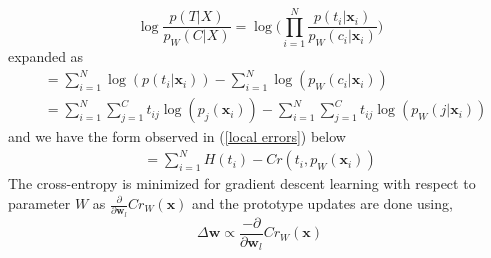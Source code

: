 \documentclass[english]{HSMW-Thesis}
\begin{document}
\begin{equation*}
	\log \frac{p\left( T|X\right) }{p_{W}\left( C|X\right) } = \log \bigg(\prod_{i=1}^{N}\frac{p\left( t_{i}|\mathbf{x}_{i}\right) }{p_{W}\left( c_{i}|\mathbf{x}_{i}\right)}\bigg)
\end{equation*}
expanded as
\begin{align*}
	&= \sum_{i=1}^{N}\log\left( p\left( t_{i}|\mathbf{x}_{i}\right)\right) - \sum_{i=1}^{N}\log\left( p_{W}\left( c_{i}|\mathbf{x}_{i}\right)\right) \\
	&=\sum_{i=1}^{N}\sum_{j=1}^{C}t_{ij}\log\left( p_{j}\left( \mathbf{x}_{i}\right) \right)- \sum_{i=1}^{N}\sum_{j=1}^{C}t_{ij}\log\left( p_{W}\left(j| \mathbf{x}_{i}\right) \right)
\end{align*}
and we have the form observed in (\ref{local errors}) below
 \begin{align*}
 	=\sum_{i=1}^{N}H\left( t_{i}\right)  - Cr\left( t_{i},p_{W}\left( \mathbf{x}_{i}\right) \right) 
 \end{align*}
The cross-entropy is minimized for gradient descent learning with respect to parameter\hspace{2pt} $W$\hspace{2pt}  as \hspace{2pt}$\frac{\partial}{\partial \mathbf{w}_{l}}Cr_{W}\left( \mathbf{x}\right)$\hspace{2pt} and the prototype updates are done using,
\begin{equation}
	\Delta \mathbf{w}\propto \frac{-\partial}{\partial \mathbf{w}_{l}}Cr_{W}\left( \mathbf{x}\right)
\end{equation}



\end{document}
